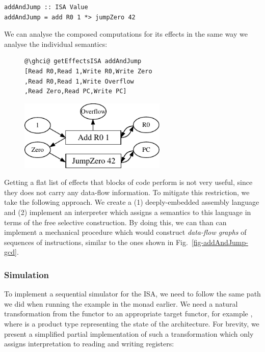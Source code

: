 \begin{verbatim}
addAndJump :: ISA Value
addAndJump = add R0 1 *> jumpZero 42
\end{verbatim}

We can analyse the composed computations for its effects in the same way we analyse the
individual semantics:

\begin{figure}[!h]
 \begin{minipage}{0.45\textwidth}
\raggedleft
\begin{verbatim}
@\ghci@ getEffectsISA addAndJump
[Read R0,Read 1,Write R0,Write Zero
,Read R0,Read 1,Write Overflow
,Read Zero,Read PC,Write PC]
\end{verbatim}
 \end{minipage}
 \begin{minipage}{0.45\textwidth}
  \centering
\includegraphics[width=7cm]{./fig/addAndJump.pdf}
 \end{minipage}
\end{figure}


Getting a flat list of effects that blocks of code perform is not very useful,
since they does not carry any data-flow information. To mitigate this restriction,
we take the following approach. We create a (1) deeply-embedded assembly language and
(2) implement an interpreter which assigns a semantics to this language in terms of the
free selective construction. By doing this, we can than can implement a mechanical procedure
which would construct \emph{data-flow graphs} of sequences of instructions, similar to
the ones shown in Fig.~\ref{fig-addAndJump-gcd}.

\subsubsection{\textbf{Simulation}}

To implement a sequential simulator for the ISA, we need to follow the same path we did
when running the  example in the  monad earlier. We need a natural
transformation from the functor  to an appropriate target functor, for example
, where  is a product type representing the state of the architecture. For brevity, we present a simplified
partial implementation of such a transformation which only assigns interpretation to reading
and writing registers:

